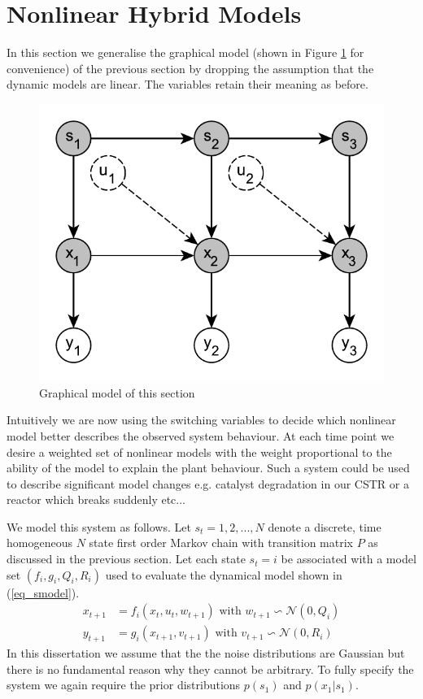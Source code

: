 \documentclass[../masters.tex]{subfiles}
\begin{document}
\graphicspath{{./imgs/}{../imgs/}} %

\section{Nonlinear Hybrid Models}
In this section we generalise the graphical model (shown in Figure \ref{fig_hybridmod2} for convenience) of the previous section by dropping the assumption that the dynamic models are linear. The variables retain their meaning as before.     
\begin{figure}[H] 
\centering
\includegraphics[scale=1.0]{hybrid_model.pdf}
\caption{Graphical model of this section}
\label{fig_hybridmod2}
\end{figure}
Intuitively we are now using the switching variables to decide which nonlinear model better describes the observed system behaviour. At each time point we desire a weighted set of nonlinear models with the weight proportional to the ability of the model to explain the plant behaviour. Such a system could be used to describe significant model changes e.g. catalyst degradation in our CSTR or a reactor which breaks suddenly etc... 

We model this system as follows. Let $s_t=1,2,..., N$ denote a discrete, time homogeneous $N$ state first order Markov chain with transition matrix $P$ as discussed in the previous section. Let each state $s_t=i$ be associated with a model set $\left(f_i, g_i, Q_i, R_i \right)$ used to evaluate the dynamical model shown in (\ref{eq_smodel}).
\begin{equation}
\begin{aligned}
x_{t+1} &= f_i(x_t, u_t, w_{t+1}) \text{ with } w_{t+1} \backsim \mathcal{N}(0, Q_i)\\
y_{t+1} &= g_i(x_{t+1}, v_{t+1}) \text{ with } v_{t+1} \backsim \mathcal{N}(0,R_i)
\end{aligned}
\label{eq_smodel}
\end{equation}
In this dissertation we assume that the the noise distributions are Gaussian but there is no fundamental reason why they cannot be arbitrary. To fully specify the system we again require the prior distributions $p(s_1)$ and $p(x_1|s_1)$.
\end{document}
